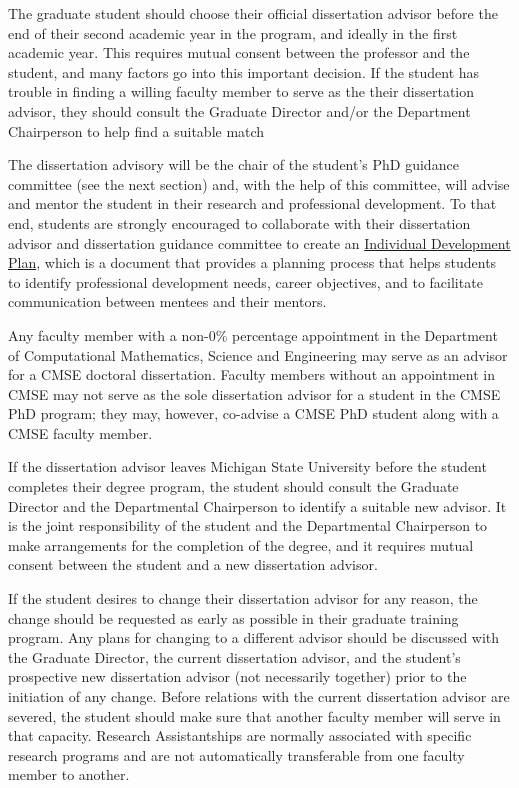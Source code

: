 The graduate student should choose their official dissertation advisor
before the end of their second academic year in the program, and
ideally in the first academic year.  This requires mutual consent
between the professor and the student, and many factors go into this
important decision.  If the student has trouble in finding a willing
faculty member to serve as the their dissertation advisor, they should
consult the Graduate Director and/or the Department Chairperson to
help find a suitable match

The dissertation advisory will be the chair of the student's PhD
guidance committee (see the next section) and, with the help of this
committee, will advise and mentor the student in their research and
professional development.   To that end, students are strongly encouraged to collaborate with their
dissertation advisor and dissertation guidance committee to create an \href{http://caffe.grd.msu.edu/IDP}{Individual
Development Plan}, which is a document that provides a planning
process that helps students to identify professional development
needs, career objectives, and to facilitate communication between
mentees and their mentors.

Any faculty member with a non-0\% percentage appointment in the
Department of Computational Mathematics, Science and Engineering may
serve as an advisor for a CMSE doctoral dissertation.  Faculty members
without an appointment in CMSE may not serve as the sole dissertation
advisor for a student in the CMSE PhD program; they may, however,
co-advise a CMSE PhD student along with a CMSE faculty member.

If the dissertation advisor leaves Michigan State University before the
student completes their degree program, the student should consult
the Graduate Director and the Departmental Chairperson to identify a
suitable new advisor.  It is the joint responsibility of the
student and the Departmental Chairperson to make arrangements for the
completion of the degree, and it requires mutual consent between the
student and a new dissertation advisor.

If the student desires to change their dissertation advisor for any
reason, the change should be requested as early as possible in their
graduate training program.  Any plans for changing to a different
advisor should be discussed with the Graduate Director, 
 the current dissertation advisor, and the student's
prospective new dissertation advisor (not necessarily together) prior
to the initiation of any change.  Before relations with the current
dissertation advisor are severed, the student should make sure that
another faculty member will serve in that capacity.  Research
Assistantships are normally associated with specific research programs
and are not automatically transferable from one faculty member to
another.

